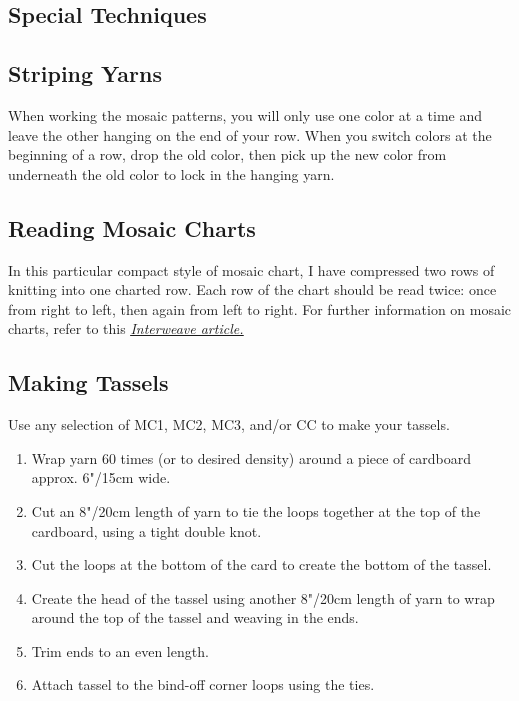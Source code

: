 \documentclass[12pt]{article}
\begin{document}
\newpage
\begin{multicols}{2}
\section*{Special Techniques}

\subsection*{Striping Yarns}

When working the mosaic patterns, you will only use one color at a time and leave the other hanging on the end of your row. When you switch colors at the beginning of a row, drop the old color, then pick up the new color from underneath the old color to lock in the hanging yarn.

\subsection*{Reading Mosaic Charts}

In this particular compact style of mosaic chart, I have compressed two rows of knitting into one charted row. Each row of the chart should be read twice: once from right to left, then again from left to right. For further information on mosaic charts, refer to this \href{https://www.interweave.com/article/knitting/tech-tip-mosaic-knitting/}{\underline{\emph{Interweave article.}}}

\subsection*{Making Tassels}

Use any selection of MC1, MC2, MC3, and/or CC to make your tassels.

\begin{enumerate}
\item Wrap yarn 60 times (or to desired density) around a piece of cardboard approx. 6"/15cm wide.
\item Cut an 8"/20cm length of yarn to tie the loops together at the top of the cardboard, using a tight double knot.
\item Cut the loops at the bottom of the card to create the bottom of the tassel.
\item Create the head of the tassel using another 8"/20cm length of yarn to wrap around the top of the tassel and weaving in the ends.
\item Trim ends to an even length.
\item Attach tassel to the bind-off corner loops using the ties.
\end{enumerate}


\end{multicols}
\end{document}
